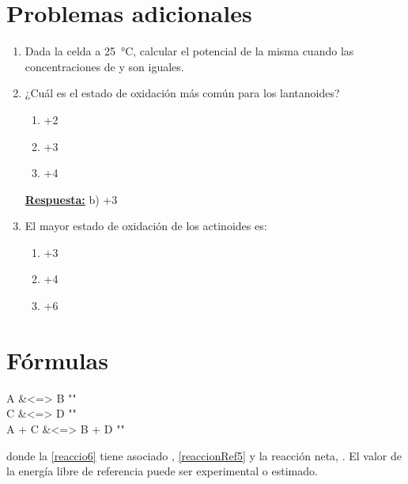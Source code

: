 \documentclass[10pt,a4paper]{article}
\newcommand{\rta}{\underline{\textbf{Respuesta:}} }
\begin{document}
\appendix
\renewcommand{\thesection}{\Alph{section}.\arabic{section}}
\setcounter{section}{0}
\begin{appendices}
	\section{Problemas adicionales}
	\begin{enumerate}
		\item  Dada la celda  a \SI{25}{\degreeCelsius}, calcular el potencial de la misma cuando las concentraciones de  y  son iguales.
	
	\item ¿Cuál es el estado de oxidación más común para los lantanoides?
	\begin{enumerate}
		\item +2
		\item +3
		\item +4
	\end{enumerate}
	
	\rta b) +3
	
	\item El mayor estado de oxidación de los actinoides es:
	\begin{enumerate}
		\item +3
		\item +4
		\item +6
	\end{enumerate}
	\end{enumerate}





\section{F\'ormulas}
\begin{reactions}
	A &<=> B "\label{reaccio6}" \\
	C &<=> D "\label{reaccionRef5}" \\
	A + C &<=> B + D "\label{reaccion_neta5}"
\end{reactions}

donde la \ref{reaccio6} tiene asociado \gibbs*[subscript-right=desc]{},
\ref{reaccionRef5} \gibbs*[subscript-right=ref]{} y la reacción neta,
\gibbs*[subscript-right=neto]{}. El valor de la energía libre de referencia
puede ser experimental o estimado.
\nocite{*}
\section{}


\end{appendices}
\end{document}
